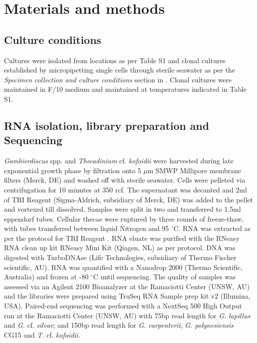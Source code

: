 \documentclass[12pt]{article}
\begin{document}
\newpage
\section{Materials and methods}
\subsection{Culture conditions}
\FloatBarrier
Cultures were isolated from locations as per Table S1 and clonal cultures established by micropipetting single cells through sterile seawater as per the \textit{Specimen collection and culture conditions} section in \cite{kretzschmar2017characterization}. 
Clonal cultures were maintained in F/10 medium \cite{holmes1991strain} and maintained at temperatures indicated in Table S1.

\subsection{RNA isolation, library preparation and Sequencing}
\emph{Gambierdiscus} spp. and \emph{Thecadinium} cf. \emph{kofoidii} were harvested during late exponential growth phase by filtration onto 5 $\mu$m SMWP Millipore membrane filters (Merck, DE) and washed off with sterile seawater. 
Cells were pelleted via centrifugation for 10 minutes at 350 rcf. 
The supernatant was decanted and 2ml of TRI Reagent (Sigma-Aldrich, subsidiary of Merck, DE) was added to the pellet and vortexed till dissolved. 
Samples were split in two and transferred to 1.5ml eppendorf tubes. 
Cellular thecae were ruptured by three rounds of freeze-thaw, with tubes transferred between liquid Nitrogen and 95 $^{\circ}$C. 
RNA was extracted as per the protocol for TRI Reagent \cite{rio2010purification}.
RNA eluate was purified with the RNeasy RNA clean up kit RNeasy Mini Kit (Qiagen, NL) as per protocol. 
DNA was digested with TurboDNAse (Life Technologies, subsidiary of Thermo Fischer scientific, AU). 
RNA was quantified with a Nanodrop 2000 (Thermo Scientific, Australia) and frozen at -80 $^{\circ}$C until sequencing.
The quality of samples was assessed via an Agilent 2100 Bioanalyzer at the Ramaciotti Center (UNSW, AU) and the libraries were prepared using TruSeq RNA Sample prep kit v2 (Illumina, USA). 
Paired-end sequencing was performed with a NextSeq 500 High Output run at the Ramaciotti Center (UNSW, AU) with 75bp read length for \emph{G. lapillus} and \emph{G.} cf. \emph{silvae}; and 150bp read length for \emph{G. carpenterii}, \emph{G. polynesiensis} CG15 and \emph{T.} cf. \emph{kofoidii}.
\end{document}
